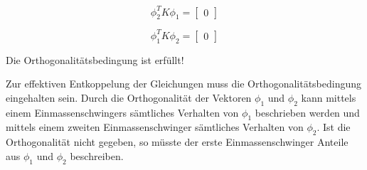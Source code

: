 \documentclass[
  letterpaper,
  DIV=11]{scrreprt}
\begin{document}
\begin{equation}\phi_{2}^{T} K \phi_{1} = \left[\begin{matrix}0\end{matrix}\right]\end{equation}

\begin{equation}\phi_{1}^{T} K \phi_{2} = \left[\begin{matrix}0\end{matrix}\right]\end{equation}

Die Orthogonalitätsbedingung ist erfüllt!

Zur effektiven Entkoppelung der Gleichungen muss die
Orthogonalitätsbedingung eingehalten sein. Durch die Orthogonalität der
Vektoren \(\phi_1\) und \(\phi_2\) kann mittels einem
Einmassenschwingers sämtliches Verhalten von \(\phi_1\) beschrieben
werden und mittels einem zweiten Einmassenschwinger sämtliches Verhalten
von \(\phi_2\). Ist die Orthogonalität nicht gegeben, so müsste der
erste Einmassenschwinger Anteile aus \(\phi_1\) und \(\phi_2\)
beschreiben.
\end{document}
